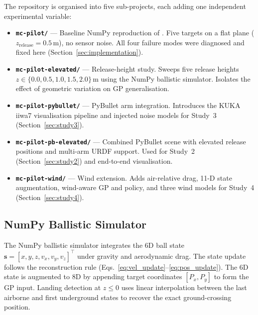 The repository is organised into five sub-projects, each adding one independent
experimental variable:

\begin{itemize}
  \item \textbf{\texttt{mc-pilot/}} --- Baseline NumPy reproduction of \mcpilot{}
        \cite{turcato2025mcpilot}. Five targets on a flat plane ($z_{\mathrm{release}}
        = 0.5$\,m), no sensor noise. All four failure modes were diagnosed and fixed
        here (Section~\ref{sec:implementation}).

  \item \textbf{\texttt{mc-pilot-elevated/}} --- Release-height study. Sweeps five
        release heights $z \in \{0.0, 0.5, 1.0, 1.5, 2.0\}$\,m using the NumPy
        ballistic simulator. Isolates the effect of geometric variation on GP
        generalisation.

  \item \textbf{\texttt{mc-pilot-pybullet/}} --- PyBullet arm integration. Introduces
        the KUKA iiwa7 visualisation pipeline and injected noise models for
        Study~3 (Section~\ref{sec:study3}).

  \item \textbf{\texttt{mc-pilot-pb-elevated/}} --- Combined PyBullet scene with
        elevated release positions and multi-arm URDF support.
        Used for Study~2 (Section~\ref{sec:study2}) and end-to-end visualisation.

  \item \textbf{\texttt{mc-pilot-wind/}} --- Wind extension. Adds air-relative drag,
        11-D state augmentation, wind-aware GP and policy, and three wind models for
        Study~4 (Section~\ref{sec:study4}).
\end{itemize}

\subsection{NumPy Ballistic Simulator}
\label{sec:system:numpy}

The NumPy ballistic simulator integrates the 6D ball state
$\mathbf{s} = [x, y, z, v_x, v_y, v_z]^\top$ under gravity and aerodynamic drag.
The state update follows the reconstruction rule (Eqs.~\ref{eq:vel_update}--\ref{eq:pos_update}).
The 6D state is augmented to 8D by appending target coordinates $[P_x, P_y]$ to form
the GP input.
Landing detection at $z \leq 0$ uses linear interpolation between the last airborne and
first underground states to recover the exact ground-crossing position.

